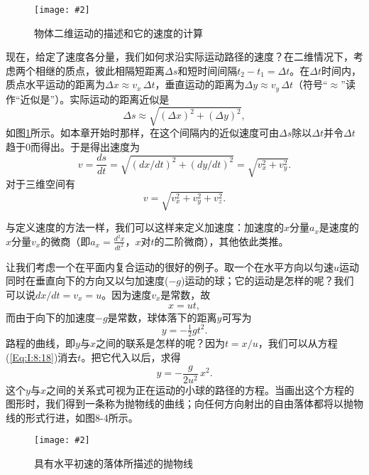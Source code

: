 \documentclass[12pt,oneside]{book}
\newenvironment{fig}[2][1]
{\begin{figure}[H]
\centering
\texttt{[image: \#2]}}
{\end{figure}}
\begin{document}
\vspace{20pt}
\begin{fig}{物体二维运动的描述和它的速度的计算}
\caption{物体二维运动的描述和它的速度的计算}
\label{fig:物体二维运动的描述和它的速度的计算}
\end{fig}
现在，给定了速度各分量，我们如何求沿实际运动路径的速度？在二维情况下，考虑两个相继的质点，彼此相隔短距离$\Delta s$和短时间间隔$t_2-t_1=\Delta t$。在$\Delta t$时间内，质点水平运动的距离为$\Delta x\approx v_x\,\Delta t$，垂直运动的距离为$\Delta y\approx v_y\,\Delta t$（符号“$\approx$”读作“近似是”）。实际运动的距离近似是
\begin{equation}
\label{Eq:I:8:14}
\Delta s\approx\sqrt{(\Delta x)^2+(\Delta y)^2},
\end{equation}
如图\ref{fig:物体二维运动的描述和它的速度的计算}所示。如本章开始时那样，在这个间隔内的近似速度可由$\Delta s$除以$\Delta t$并令$\Delta t$趋于0而得出。于是得出速度为
\begin{equation}
\label{Eq:I:8:15}
v=\frac{ds}{dt}=\sqrt{(dx/dt)^2+(dy/dt)^2}=\sqrt{v_x^2+v_y^2}.
\end{equation}
对于三维空间有
\begin{equation}
\label{Eq:I:8:16}
v=\sqrt{v_x^2+v_y^2+v_z^2}.
\end{equation}

与定义速度的方法一样，我们可以这样来定义加速度：加速度的$x$分量$a_x$是速度的$x$分量$v_x$的微商（即$a_x=\frac{d^2x}{dt^2}$，$x$对$t$的二阶微商），其他依此类推。

让我们考虑一个在平面内复合运动的很好的例子。取一个在水平方向以匀速$u$运动同时在垂直向下的方向又以匀加速度($-g$)运动的球；它的运动是怎样的呢？我们可以说$dx/dt=v_x=u$。因为速度$v_x$是常数，故
\begin{equation}
\label{Eq:I:8:17}
x=ut,
\end{equation}
而由于向下的加速度$-g$是常数，球体落下的距离$y$可写为
\begin{equation}
\label{Eq:I:8:18}
y=-\tfrac{1}{2}gt^2.
\end{equation}
路程的曲线，即$y$与$x$之间的联系是怎样的呢？因为$t=x/u$，我们可以从方程(\ref{Eq:I:8:18})消去$t$。把它代入以后，求得
\begin{equation}
\label{Eq:I:8:19}
y=-\frac{g}{2u^2}\,x^2.
\end{equation}
这个$y$与$x$之间的关系式可视为正在运动的小球的路径的方程。当画出这个方程的图形时，我们得到一条称为抛物线的曲线；向任何方向射出的自由落体都将以抛物线的形式行进，如图8-4所示。 

\begin{fig}{具有水平初速的落体所描述的抛物线}
\caption{具有水平初速的落体所描述的抛物线}
\label{fig:具有水平初速的落体所描述的抛物线}
\end{fig}
\end{document}
